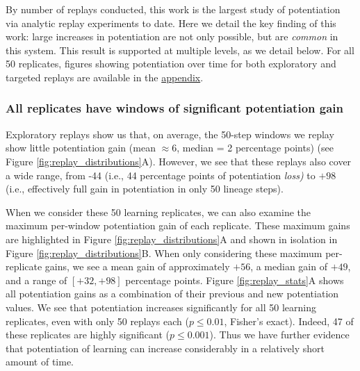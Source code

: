 By number of replays conducted, this work is the largest study of potentiation via analytic replay experiments to date. 
Here we detail the key finding of this work: large increases in potentiation are not only possible, but are \textit{common} in this system.
This result is supported at multiple levels, as we detail below. 
For all 50 replicates, figures showing potentiation over time for both exploratory and targeted replays are available in the \hyperref[chap:app_a]{appendix}.

\subsubsection{All replicates have windows of significant potentiation gain}

Exploratory replays show us that, on average, the 50-step windows we replay show little potentiation gain (mean $\approx 6$, median = 2 percentage points) (see Figure \ref{fig:replay_distributions}A).
However, we see that these replays also cover a wide range, from -44 (i.e., 44 percentage points of potentiation \textit{loss)} to $+98$ (i.e., effectively full gain in potentiation in only 50 lineage steps). 

When we consider these 50 learning replicates, we can also examine the maximum per-window potentiation gain of each replicate.
These maximum gains are highlighted in Figure \ref{fig:replay_distributions}A and shown in isolation in Figure \ref{fig:replay_distributions}B.
When only considering these maximum per-replicate gains, we see a mean gain of approximately $+56$, a median gain of $+49$, and a range of $[+32, +98]$ percentage points.
Figure \ref{fig:replay_stats}A shows all potentiation gains as a combination of their previous and new potentiation values. 
We see that potentiation increases significantly for all 50 learning replicates, even with only 50 replays each ($p \leq 0.01$, Fisher's exact). 
Indeed, 47 of these replicates are highly significant ($p \leq 0.001$). 
Thus we have further evidence that potentiation of learning can increase considerably in a relatively short amount of time. 

